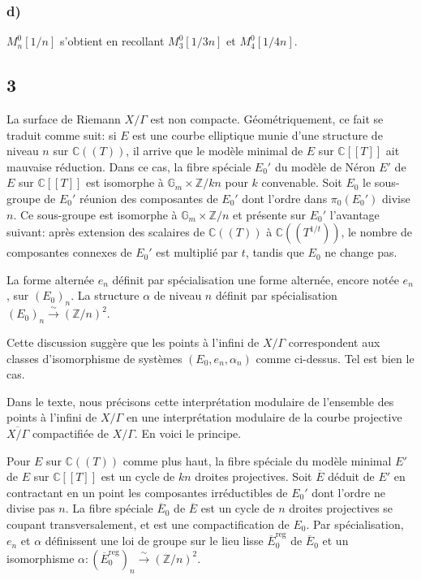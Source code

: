 \documentclass{amsart}
\theoremstyle{plain}
\theoremstyle{remark}
\newcommand{\bbC}{\mathbb{C}}
\newcommand{\bbG}{\mathbb{G}}
\newcommand{\bbZ}{\mathbb{Z}}
\begin{document}
\subsubsection*{d)}
$M_n^0[1/n]$ s'obtient en recollant $M_3^0[1/3n]$ et $M_4^0[1/4n]$.

\subsection*{3}
La surface de Riemann $X/\Gamma$ est non compacte. G\'eom\'etriquement, ce fait se traduit comme suit: si $E$ est une courbe elliptique munie d'une structure de niveau $n$ sur $\bbC((T))$, il arrive que le mod\`ele minimal de $E$ sur $\bbC[[T]]$ ait mauvaise r\'eduction. Dans ce cas, la fibre sp\'eciale $E_0'$ du mod\`ele de N\'eron $E'$ de $E$ sur $\bbC[[T]]$ est isomorphe \`a $\bbG_m \times \bbZ/kn$ pour $k$ convenable. Soit $E_0$ le sous-groupe de $E_0'$ r\'eunion des composantes de $E_0'$ dont l'ordre dans $\pi_0(E_0')$ divise $n$. Ce sous-groupe est isomorphe \`a $\bbG_m \times \bbZ/n$ et pr\'esente sur $E_0'$ l'avantage suivant: apr\`es extension des scalaires de $\bbC((T))$ \`a $\bbC((T^{1/t}))$, le nombre de composantes connexes de $E_0'$ est multipli\'e par $t$, tandis que $E_0$ ne change pas.

La forme altern\'ee $e_n$ d\'efinit par sp\'ecialisation une forme altern\'ee, encore not\'ee $e_n$, sur $(E_0)_n$. La structure $\alpha$ de niveau $n$ d\'efinit par sp\'ecialisation $(E_0)_n \xrightarrow{\sim} (\bbZ/n)^2$.

Cette discussion sugg\`ere que les points \`a l'infini de $X/\Gamma$ correspondent aux classes d'isomorphisme de syst\`emes $(E_0,e_n,\alpha_n)$ comme ci-dessus. Tel est bien le cas.

Dans le texte, nous pr\'ecisons cette interpr\'etation modulaire de l'ensemble des points \`a l'infini de $X/\Gamma$ en une interpr\'etation modulaire de la courbe projective $\overline{X/\Gamma}$ compactifi\'ee de $X/\Gamma$. En voici le principe.

Pour $E$ sur $\bbC((T))$ comme plus haut, la fibre sp\'eciale du mod\`ele minimal $E'$ de $E$ sur $\bbC[[T]]$ est un cycle de $kn$ droites projectives. Soit $\overline{E}$ d\'eduit de $E'$ en contractant en un point les composantes irr\'eductibles de $E_0'$ dont l'ordre ne divise pas $n$. La fibre sp\'eciale $\overline{E}_0$ de $\overline{E}$ est un cycle de $n$ droites projectives se coupant transversalement, et est une compactification de $E_0$. Par sp\'ecialisation, $e_n$ et $\alpha$ d\'efinissent une loi de groupe sur le lieu lisse $\overline{E}_0^{\mathrm{reg}}$ de $\overline{E}_0$ et un isomorphisme $\alpha: (\overline{E}_0^{\mathrm{reg}})_n \xrightarrow{\sim} (\bbZ/n)^2$.
\end{document}
